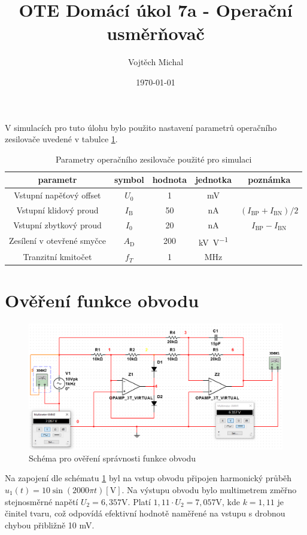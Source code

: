 \documentclass[twoside]{article}
\title{OTE Domácí úkol 7a - Operační usměrňovač}
\author{Vojtěch Michal}
\date{\today}
\begin{document}
\maketitle

V simulacích pro tuto úlohu bylo použito nastavení parametrů operačního zesilovače uvedené v tabulce \ref{tab:oz_param}.

\begin{table}[h!]
    \centering
    \begin{tabular}{c|c|c|c|c}
        parametr & symbol & hodnota & jednotka & poznámka\\
        \hline
        Vstupní napěťový offset & $U_0$ & 1 & \si{\milli\volt} & \\
        Vstupní klidový proud & $I_\text{B}$ & 50 & \si{\nano\ampere} & $(I_\text{BP} + I_\text{BN})/2$ \\
        Vstupní zbytkový proud & $I_0$ & 20 & \si{\nano\ampere} & $I_\text{BP} - I_\text{BN}$ \\
        Zesílení v otevřené smyčce & $A_\text{D}$ & 200 & \si{\kilo\volt\per\volt} & \\
        Tranzitní kmitočet& $f_T$ & 1 & \si{\mega\hertz} &
    \end{tabular}
    \caption{Parametry operačního zesilovače použité pro simulaci}
    \label{tab:oz_param}
\end{table}

\section{Ověření funkce obvodu}

\begin{figure}[h!]
    \centering
    \includegraphics[width=0.8\linewidth]{schema_overeni.png}
    \caption{Schéma pro ověření správnosti funkce obvodu}
    \label{fig:schema_overeni}
\end{figure}

Na zapojení dle schématu \ref{fig:schema_overeni} byl na vstup obvodu připojen
harmonický průběh $u_1(t) = 10 \sin \left(2000\pi t\right) [\si{\volt}]$.
Na výstupu obvodu bylo multimetrem změřno stejnosměrné napětí $U_2 = 6,357 \si{\volt}$.
Platí $1,11 \cdot  U_2 = 7,057 \si{\volt}$, kde $k = 1,11$ je činitel tvaru, což odpovídá efektivní hodnotě naměřené 
na vstupu s drobnou chybou přibližně 10 \si{\milli\volt}.
\end{document}

